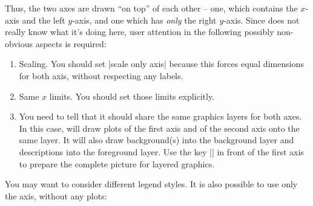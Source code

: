 {\begin{codeexample}[]
\end{codeexample}
%
\noindent Thus, the two axes are drawn ``on top'' of each other -- one, which
contains the $x$-axis and the left $y$-axis, and one which has \emph{only} the
right $y$-axis. Since \PGFPlots{} does not really know what it's doing here,
user attention in the following possibly non-obvious aspects is required:
%
\begin{enumerate}
    \item Scaling. You should set |scale only axis| because this forces equal
        dimensions for both axis, without respecting any labels.
    \item Same $x$ limits. You should set those limits explicitly.
    \item You need to tell \PGFPlots{} that it should share the same graphics
        layers for both axes. In this case, \PGFPlots{} will draw plots of
        the first axis and of the second axis onto the same layer. It will
        also draw background(s) into the background layer and descriptions
        into the foreground layer. Use the key |\pgfplotsset{set layers}| in
        front of the first axis to prepare the complete picture for layered
        graphics.
\end{enumerate}
%
You may want to consider different legend styles. It is also possible to use
only the axis, without any plots:
%
\begin{codeexample}[]
\end{codeexample}
}


